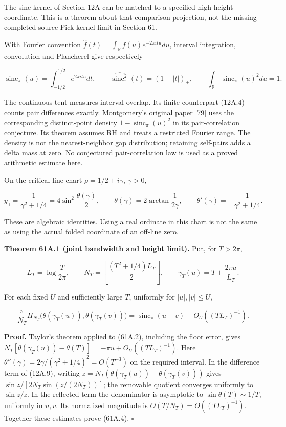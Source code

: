 \documentclass[
  11pt,
]{book}
\begin{document}
The sine kernel of Section 12A can be matched to a specified high-height
coordinate. This is a theorem about that comparison projection, not the
missing completed-source Pick-kernel limit in Section 61.

With Fourier convention
\(\widehat f(t)=\int_{\mathbb R}f(u)e^{-2\pi itu}du\), interval
integration, convolution and Plancherel give respectively

\[
\operatorname{sinc}_\pi(u)=\int_{-1/2}^{1/2}e^{2\pi itu}dt,\qquad
\widehat{\operatorname{sinc}_\pi^2}(t)=(1-|t|)_+,\qquad
\int_{\mathbb R}\operatorname{sinc}_\pi(u)^2du=1.
\tag{61A.1}
\]

The continuous tent measures interval overlap. Its finite counterpart
(12A.4) counts pair differences exactly. Montgomery's original paper
{[}79{]} uses the corresponding distinct-point density
\(1-\operatorname{sinc}_\pi(u)^2\) in its pair-correlation conjecture.
Its theorem assumes RH and treats a restricted Fourier range. The
density is not the nearest-neighbor gap distribution; retaining
self-pairs adds a delta mass at zero. No conjectured pair-correlation
law is used as a proved arithmetic estimate here.

On the critical-line chart \(\rho=1/2+i\gamma\), \(\gamma>0\),

\[
 y_\gamma=\frac1{\gamma^2+1/4}
 =4\sin^2\frac{\theta(\gamma)}2,\qquad
 \theta(\gamma)=2\arctan\frac1{2\gamma},\qquad
 \theta'(\gamma)=-\frac1{\gamma^2+1/4}.
\tag{61A.2}
\]

These are algebraic identities. Using a real ordinate in this chart is
not the same as using the actual folded coordinate of an off-line zero.

\textbf{Theorem 61A.1 (joint bandwidth and height limit).} Put, for
\(T>2\pi\),

\[
 L_T=\log\frac{T}{2\pi},\qquad
 N_T=\left\lfloor\frac{(T^2+1/4)L_T}{2}\right\rfloor,\qquad
 \gamma_T(u)=T+\frac{2\pi u}{L_T}.
\tag{61A.3}
\]

For each fixed \(U\) and sufficiently large \(T\), uniformly for
\(|u|,|v|\le U\),

\[
\boxed{\frac\pi{N_T}\Pi_{N_T}
 \bigl(\theta(\gamma_T(u)),\theta(\gamma_T(v))\bigr)
 =\operatorname{sinc}_\pi(u-v)+O_U((TL_T)^{-1}).}
\tag{61A.4}
\]

\textbf{Proof.} Taylor's theorem applied to (61A.2), including the floor
error, gives
\(N_T[\theta(\gamma_T(u))-\theta(T)]=-\pi u+O_U((TL_T)^{-1})\). Here
\(\theta''(\gamma)=2\gamma/(\gamma^2+1/4)^2=O(T^{-3})\) on the required
interval. In the difference term of (12A.9), writing
\(z=N_T(\theta(\gamma_T(u))-\theta(\gamma_T(v)))\) gives
\(\sin z/[2N_T\sin(z/(2N_T))]\); the removable quotient converges
uniformly to \(\sin z/z\). In the reflected term the denominator is
asymptotic to \(\sin\theta(T)\sim1/T\), uniformly in \(u,v\). Its
normalized magnitude is \(O(T/N_T)=O((TL_T)^{-1})\). Together these
estimates prove (61A.4). \(\square\)
\end{document}
